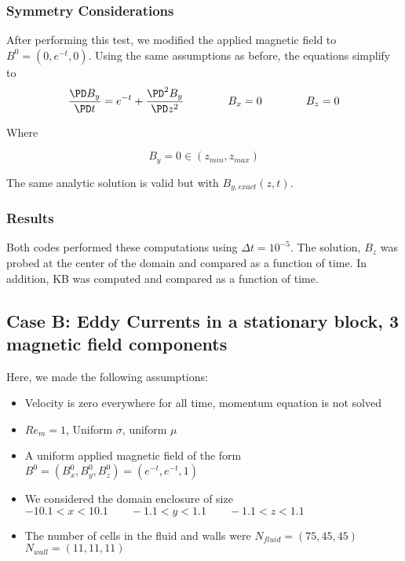 \documentclass[11pt]{article}
\begin{document}
\subsubsection{Symmetry Considerations}

After performing this test, we modified the applied magnetic field to $B^0=(0,e^{-t},0)$. Using the same assumptions as before, the equations simplify to
\begin{equation}
	\frac{\PD B_y}{\PD t}
	=
	e^{-t}
	+
	\frac{\PD^2 B_y}{\PD z^2}
	\qquad \qquad
	B_x = 0
	\qquad \qquad
	B_z = 0
\end{equation}

Where

\begin{equation}
	B_y = 0
	\in (z_{min}, z_{max})
\end{equation}

The same analytic solution is valid but with $B_{y,exact}(z,t)$.

\subsubsection{Results}
Both codes performed these computations using $\Delta t = 10^{-5}$. The solution, $B_z$ was probed at the center of the domain and compared as a function of time. In addition, KB was computed and compared as a function of time.


\subsection{Case B: Eddy Currents in a stationary block, 3 magnetic field components}
Here, we made the following assumptions:

\begin{itemize}
\item Velocity is zero everywhere for all time, momentum equation is not solved
\item $Re_m = 1$, Uniform $\sigma$, uniform $\mu$
\item A uniform applied magnetic field of the form $B^0 = (B_x^0,B_y^0,B_z^0) = (e^{-t},e^{-t},1)$
\item We considered the domain enclosure of size $-10.1 < x < 10.1 \qquad -1.1 < y < 1.1 \qquad -1.1 < z < 1.1$
\item The number of cells in the fluid and walls were $N_{fluid} = (75,45,45)$ \qquad $N_{wall} = (11,11,11)$
\end{itemize}
\end{document}
